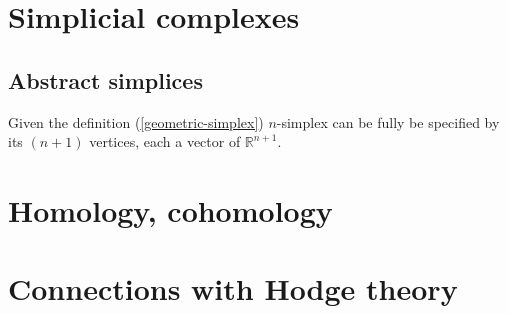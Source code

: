 \documentclass{tufte-handout}
\newtheorem{app}{Application}
\newcommand{\re}{\mathbb{R}}
\begin{document}
 
\section{Simplicial complexes}
\subsection{Abstract simplices}
Given the definition (\ref{geometric-simplex}) $n$-simplex can be fully be specified by its $(n+1)$ vertices, each a vector of $\re^{n+1}$. 
\section{Homology, cohomology}

\section{Connections with Hodge theory}
\nocite{*}


\end{document}
